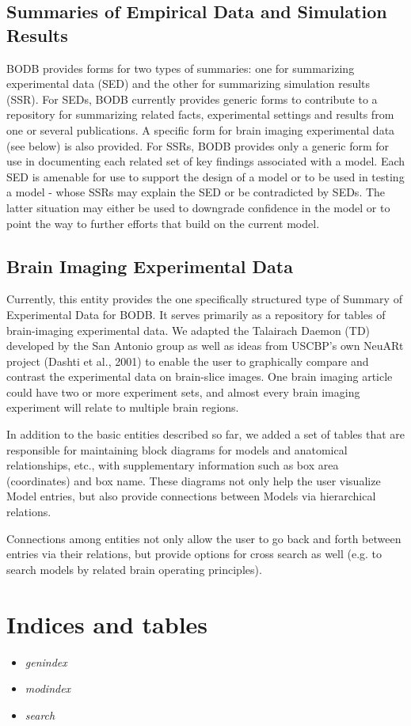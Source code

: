 \documentclass[letterpaper,10pt,english]{sphinxmanual}
\begin{document}
\section{Summaries of Empirical Data and Simulation Results}
\label{conceptual_overview:summaries-of-empirical-data-and-simulation-results}
BODB provides forms for two types of summaries: one for summarizing experimental data (SED) and the other for summarizing simulation results (SSR). For SEDs, BODB currently provides generic forms to contribute to a repository for summarizing related facts, experimental settings and results from one or several publications. A specific form for brain imaging experimental data (see below) is also provided. For SSRs, BODB provides only a generic form for use in documenting each related set of key findings associated with a model. Each SED is amenable for use to support the design of a model or to be used in testing a model - whose SSRs may explain the SED or be contradicted by SEDs. The latter situation may either be used to downgrade confidence in the model or to point the way to further efforts that build on the current model.


\section{Brain Imaging Experimental Data}
\label{conceptual_overview:brain-imaging-experimental-data}
Currently, this entity provides the one specifically structured type of Summary of Experimental Data for BODB. It serves primarily as a repository for tables of brain-imaging experimental data. We adapted the Talairach Daemon (TD) developed by the San Antonio group as well as ideas from USCBP’s own NeuARt project (Dashti et al., 2001) to enable the user to graphically compare and contrast the experimental data on brain-slice images. One brain imaging article could have two or more experiment sets, and almost every brain imaging experiment will relate to multiple brain regions.

In addition to the basic entities described so far, we added a set of tables that are responsible for maintaining block diagrams for models and anatomical relationships, etc., with supplementary information such as box area (coordinates) and box name. These diagrams not only help the user visualize Model entries, but also provide connections between Models via hierarchical relations.

Connections among entities not only allow the user to go back and forth between entries via their relations, but provide options for cross search as well (e.g. to search models by related brain operating principles).


\chapter{Indices and tables}
\label{index:indices-and-tables}\begin{itemize}
\item {} 
\emph{genindex}

\item {} 
\emph{modindex}

\item {} 
\emph{search}

\end{itemize}



\renewcommand{\indexname}{Index}
\printindex
\end{document}

